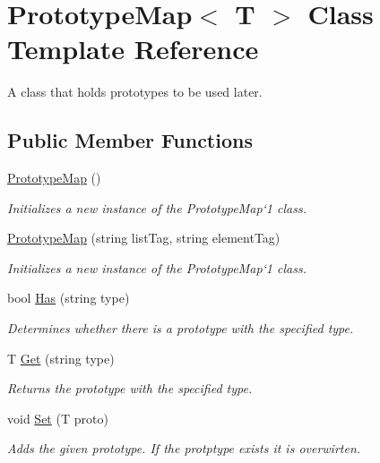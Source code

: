\hypertarget{class_prototype_map}{}\section{Prototype\+Map$<$ T $>$ Class Template Reference}
\label{class_prototype_map}


A class that holds prototypes to be used later.  


\subsection*{Public Member Functions}
\begin{DoxyCompactItemize}
\item 
\hyperlink{class_prototype_map_a980e1783fc0a6997a7266e91a507e38b}{Prototype\+Map} ()
\begin{DoxyCompactList}\small\item\em Initializes a new instance of the Prototype\+Map`1 class. \end{DoxyCompactList}\item 
\hyperlink{class_prototype_map_af3d81ed7fda9fd1293bf3f3da095c477}{Prototype\+Map} (string list\+Tag, string element\+Tag)
\begin{DoxyCompactList}\small\item\em Initializes a new instance of the Prototype\+Map`1 class. \end{DoxyCompactList}\item 
bool \hyperlink{class_prototype_map_af56d8b380f8f0375eef1e4de0e25283b}{Has} (string type)
\begin{DoxyCompactList}\small\item\em Determines whether there is a prototype with the specified type. \end{DoxyCompactList}\item 
T \hyperlink{class_prototype_map_a7cd5603d0944ca8baa6c6df01b8e3ad7}{Get} (string type)
\begin{DoxyCompactList}\small\item\em Returns the prototype with the specified type. \end{DoxyCompactList}\item 
void \hyperlink{class_prototype_map_a68826fa80281a5e81f301b557ca1a37d}{Set} (T proto)
\begin{DoxyCompactList}\small\item\em Adds the given prototype. If the protptype exists it is overwirten. \end{DoxyCompactList}\item 

\end{DoxyCompactItemize}
